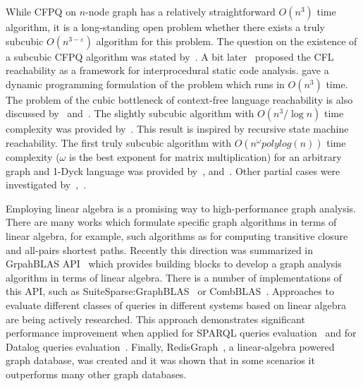 While CFPQ on $n$-node graph has a relatively straightforward $O(n^3)$ time algorithm, it is a long-standing open problem whether there exists a truly  subcubic $O(n^{3-\varepsilon})$ algorithm for this problem.
The question on the existence of a subcubic CFPQ algorithm was stated by~\cite{Yannakakis}.
A bit later~\cite{10.5555/271338.271343} proposed the CFL reachability as a framework for interprocedural static code analysis.
\cite{10.1145/258994.259006} gave a dynamic programming formulation of the problem which runs in $O(n^3)$ time.
The problem of the cubic bottleneck of context-free language reachability is also discussed by~\cite{10.5555/788019.788876} and~\cite{10.1145/258994.259006}.
The slightly subcubic algorithm with $O(n^3/\log{n})$ time complexity was provided by~\cite{10.1145/1328438.1328460}.
This result is inspired by recursive state machine reachability.
The first truly subcubic algorithm with $O(n^\omega polylog(n))$ time complexity ($\omega$ is the best exponent for matrix multiplication) for an arbitrary graph and 1-Dyck language was provided by~\cite{8249039}, and~\cite{pavlogiannis2020finegrained}.
Other partial cases were investigated by~\cite{10.1145/3158118},~\cite{zhang2020conditional}.

Employing linear algebra is a promising way to high-performance graph analysis.
There are many works which formulate specific graph algorithms in terms of linear algebra, for example, such algorithms as for computing transitive closure and all-pairs shortest paths.
Recently this direction was summarized in GrpahBLAS API~\citep{7761646} which provides building blocks to develop a graph analysis algorithm in terms of linear algebra.
There is a number of implementations of this API, such as SuiteSparse:GraphBLAS~\citep{10.1145/3322125} or CombBLAS~\citep{10.1177/1094342011403516}.
Approaches to evaluate different classes of queries in different systems based on linear algebra are being actively researched.
This approach demonstrates significant performance improvement when applied for SPARQL queries evaluation~\citep{10.1145/3302424.3303962,DBLP:journals/corr/MetzlerM15a} and for Datalog queries evaluation~\citep{sato_2017}.
Finally, RedisGraph~\citep{8778293}, a linear-algebra powered graph database, was created and it was shown that in some scenarios it outperforms many other graph databases.